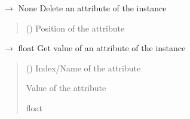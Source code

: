\documentclass[letterpaper,10pt,english]{sphinxmanual}
\begin{document}
\begin{fulllineitems}
\begin{fulllineitems}
\end{fulllineitems}


\begin{fulllineitems}
\label{\detokenize{data/_autosummary/miml.data.instance.Instance:miml.data.instance.Instance.delete_attribute}}
\pysigstartsignatures
\pysiglinewithargsret
{}
{}
{{ $\rightarrow$ None}}
\pysigstopsignatures
\sphinxAtStartPar
Delete an attribute of the instance
\begin{quote}\begin{description}
\sphinxAtStartPar
{} () \textendash{} Position of the attribute

\end{description}\end{quote}

\end{fulllineitems}


\begin{fulllineitems}
\label{\detokenize{data/_autosummary/miml.data.instance.Instance:miml.data.instance.Instance.get_attribute}}
\pysigstartsignatures
\pysiglinewithargsret
{}
{}
{{ $\rightarrow$ float}}
\pysigstopsignatures
\sphinxAtStartPar
Get value of an attribute of the instance
\begin{quote}\begin{description}
\sphinxAtStartPar
{} () \textendash{} Index/Name of the attribute

\sphinxAtStartPar
{} \textendash{} Value of the attribute

\sphinxAtStartPar
float

\end{description}\end{quote}


\end{fulllineitems}
\end{fulllineitems}
\end{document}
